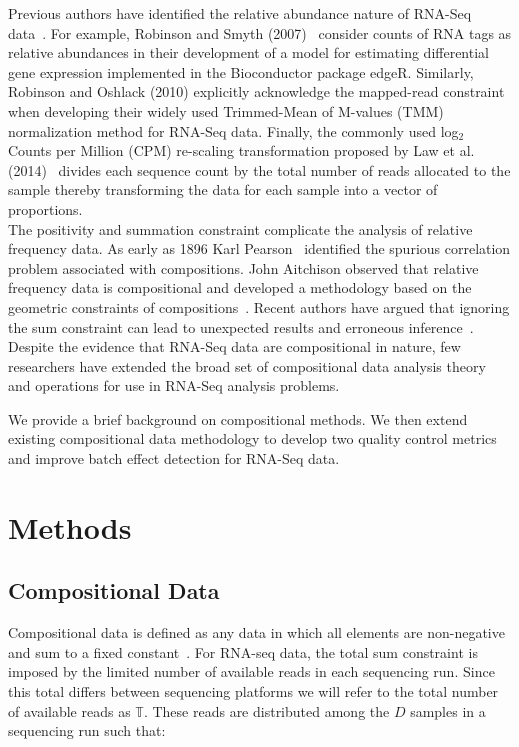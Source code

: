 \documentclass{article}\usepackage[]{graphicx}\usepackage[]{color}
\theoremstyle{definition}
\begin{document}
Previous authors have identified the relative abundance nature of RNA-Seq data~\cite{Robinson2007, Anders2010, Robinson2010, Law2014, Lovell2015}.  For example, Robinson and Smyth (2007)~\cite{Robinson2007} consider counts of RNA tags as relative abundances in their development of a model for estimating differential gene expression implemented in the Bioconductor package edgeR.  Similarly, Robinson and Oshlack (2010) explicitly acknowledge the mapped-read constraint when developing their widely used Trimmed-Mean of M-values (TMM) normalization method for RNA-Seq data. Finally, the commonly used log$_2$ Counts per Million (CPM) re-scaling transformation proposed by Law et al. (2014)~\cite{Law2014} divides each sequence count by the total number of reads allocated to the sample thereby transforming the data for each sample into a vector of proportions. \\%


The positivity and summation constraint complicate the analysis of relative frequency data.  As early as 1896 Karl Pearson~\cite{Pearson1896} identified the spurious correlation problem associated with compositions.  John Aitchison observed that relative frequency data is compositional and developed a methodology based on the geometric constraints of compositions~\cite{Aitchison1986}.  Recent authors have argued that ignoring the sum constraint can lead to unexpected results and erroneous inference~\cite{Lovell2011}.  Despite the evidence that RNA-Seq data are compositional in nature, few researchers have extended the broad set of compositional data analysis theory and operations for use in RNA-Seq analysis problems.  

We provide a brief background on compositional methods.  We then extend existing compositional data methodology to develop two quality control metrics and improve batch effect detection for RNA-Seq data.\\%

%

\section{Methods}

\subsection{Compositional Data}
Compositional data is defined as any data in which all elements are non-negative and sum to a fixed constant~\cite{Aitchison1986}. %
For RNA-seq data, the total sum constraint is imposed by the limited number of available reads in each sequencing run.  Since this total differs between sequencing platforms we will refer to the total number of available reads as $\mathbb{T}$. These reads are distributed among the $D$ samples in a sequencing run such that:
\end{document}
